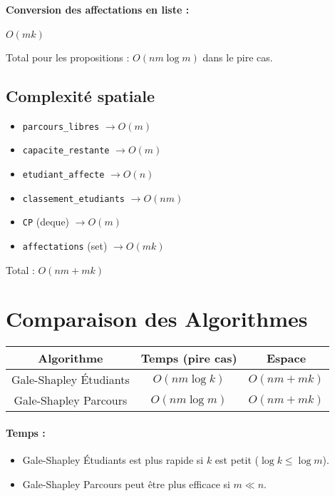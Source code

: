 \documentclass[a4paper,11pt]{article}
\begin{document}
\paragraph{Conversion des affectations en liste :} $O(mk)$

Total pour les propositions : $O(nm \log m)$ dans le pire cas.

\subsection{Complexité spatiale}
\begin{itemize}
    \item \texttt{parcours\_libres} $\rightarrow O(m)$
    \item \texttt{capacite\_restante} $\rightarrow O(m)$
    \item \texttt{etudiant\_affecte} $\rightarrow O(n)$
    \item \texttt{classement\_etudiants} $\rightarrow O(nm)$
    \item \texttt{CP} (deque) $\rightarrow O(m)$
    \item \texttt{affectations} (set) $\rightarrow O(mk)$
\end{itemize}
Total : $O(nm + mk)$

\section{Comparaison des Algorithmes}
\begin{center}
\begin{tabular}{|c|c|c|}
    \hline
    Algorithme & Temps (pire cas) & Espace \\
    \hline
    Gale-Shapley Étudiants & $O(nm \log k)$ & $O(nm + mk)$ \\
    Gale-Shapley Parcours & $O(nm \log m)$ & $O(nm + mk)$ \\
    \hline
\end{tabular}
\end{center}

\paragraph{Temps :}
\begin{itemize}
    \item Gale-Shapley Étudiants est plus rapide si $k$ est petit ($\log k \leq \log m$).
    \item Gale-Shapley Parcours peut être plus efficace si $m \ll n$.
\end{itemize}
\end{document}
